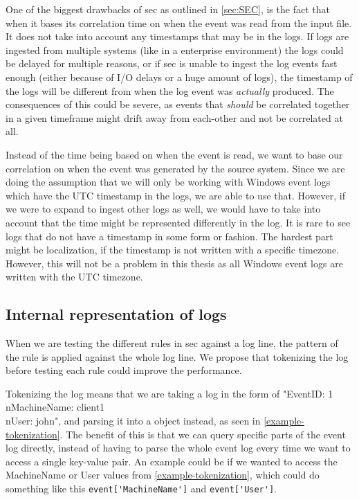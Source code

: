 One of the biggest drawbacks of \acrshort{sec} as outlined in \cref{sec:SEC}, is the fact that when it bases its correlation time on when the event was read from the input file. It does not take into account any timestamps that may be in the logs.
If logs are ingested from multiple systems (like in a enterprise environment) the logs could be delayed for multiple reasons, or if \acrshort{sec} is unable to ingest the log events fast enough (either because of I/O delays or a huge amount of logs), the timestamp of the logs will be different from when the log event was \textit{actually} produced. The consequences of this could be severe, as events that \textit{should} be correlated together in a given timeframe might drift away from each-other and not be correlated at all.

Instead of the time being based on when the event is read, we want to base our correlation on when the event was generated by the source system. Since we are doing the assumption that we will only be working with Windows event logs which have the UTC timestamp in the logs, we are able to use that. However, if we were to expand to ingest other logs as well, we would have to take into account that the time might be represented differently in the log. It is rare to see logs that do not have a timestamp in some form or fashion. The hardest part might be localization, if the timestamp is not written with a specific timezone. However, this will not be a problem in this thesis as all Windows event logs are written with the UTC timezone.

\subsection{Internal representation of logs}
\label{sub:internal-rep-of-logs}
When we are testing the different rules in \acrshort{sec} against a log line, the pattern of the rule is applied against the whole log line. We propose that tokenizing the log before testing each rule could improve the performance.

Tokenizing the log means that we are taking a log in the form of "EventID: 1\\nMachineName: client1\\nUser: john", and parsing it into a object instead, as seen in \cref{example-tokenization}. The benefit of this is that we can query specific parts of the event log directly, instead of having to parse the whole event log every time we want to access a single key-value pair. An example could be if we wanted to access the MachineName or User values from \cref{example-tokenization}, which could do something like this  \lstinline{event['MachineName']} and \lstinline{event['User']}.


